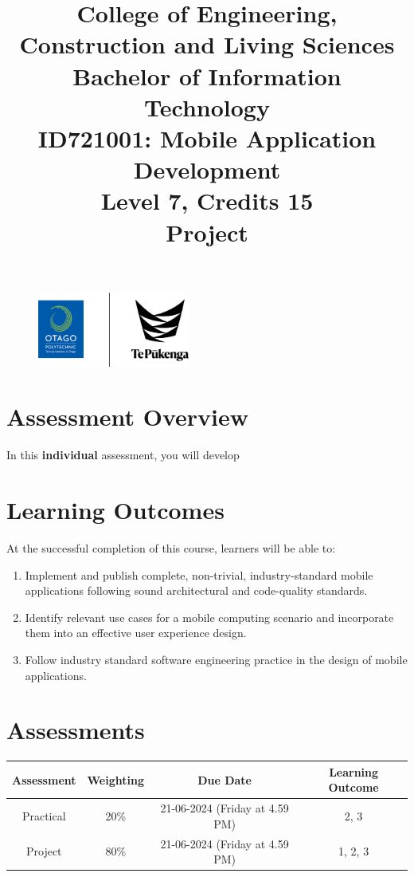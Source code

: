 \documentclass{article}
\author{}
\begin{document}
 

\begin{figure}
	\centering
	\includegraphics[width=50mm]{../img/logo.png}
\end{figure} 

\title{College of Engineering, Construction and Living Sciences\\Bachelor of Information Technology\\ID721001: Mobile Application Development\\Level 7, Credits 15\\\textbf{Project}}
\date{}
\maketitle

\section*{Assessment Overview}
In this \textbf{individual} assessment, you will develop 

\section*{Learning Outcomes}
At the successful completion of this course, learners will be able to:
\begin{enumerate}
	\item Implement and publish complete, non-trivial, industry-standard mobile applications following sound architectural and code-quality standards.
	\item Identify relevant use cases for a mobile computing scenario and incorporate them into an effective user experience design.
	\item Follow industry standard software engineering practice in the design of mobile applications.
\end{enumerate}

\section*{Assessments}
\renewcommand{\arraystretch}{1.5}
\begin{tabular}{|c|c|c|c|}
	\hline
	\textbf{Assessment}                                 & \textbf{Weighting} & \textbf{Due Date}            & \textbf{Learning Outcome} \\ \hline
	\small Practical & \small 20\%        & \small 21-06-2024 (Friday at 4.59 PM)   & \small 2, 3                   \\ \hline
	\small Project                 & \small 80\%        & \small 21-06-2024 (Friday at 4.59 PM) \small  & \small 1, 2, 3                   \\ \hline
\end{tabular}
\end{document}
